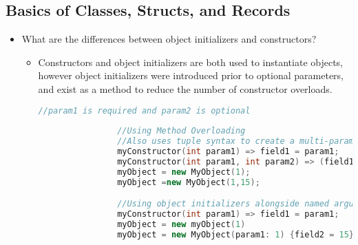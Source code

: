 \documentclass{article}
\begin{document}
\subsection{Basics of Classes, Structs, and Records}
\begin{itemize}
    \item What are the differences between object initializers and constructors?
    \begin{itemize}
        \item Constructors and object initializers are both used to instantiate objects, however object initializers were introduced prior to optional parameters, and exist as a method to reduce the number of constructor overloads.
        \begin{lstlisting}[language=C++]
                //param1 is required and param2 is optional
                
                //Using Method Overloading
                //Also uses tuple syntax to create a multi-parameter expression-bodied                       constructor.
                myConstructor(int param1) => field1 = param1;
                myConstructor(int param1, int param2) => (field1, field2) = (param1, param2);
                myObject = new MyObject(1);
                myObject =new MyObject(1,15);

                //Using object initializers alongside named arguments
                myConstructor(int param1) => field1 = param1;
                myObject = new myObject(1)
                myObject = new MyObject(param1: 1) {field2 = 15}


\end{lstlisting}
\end{itemize}
\end{itemize}
\end{document}
